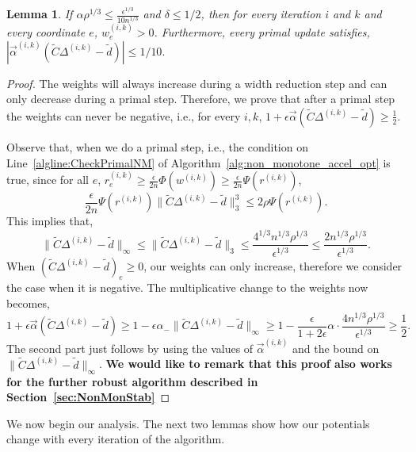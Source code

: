 \documentclass[11pt]{article}
\newtheorem{lemma}[theorem]{Lemma}
\newcommand\dd{\boldsymbol{\mathit{d}}}
\newcommand\rr{\boldsymbol{\mathit{r}}}
\newcommand\ww{\boldsymbol{\mathit{w}}}
\newcommand\CC{\boldsymbol{\mathit{C}}}
\newcommand{\wt}{\widetilde}
\begin{document}
\begin{lemma}\label{lem:positiveWopt}
 If $\alpha \rho^{1/3}\leq \frac{\epsilon^{1/3}}{10 n^{1/3}}$ and $\delta \leq 1/2$, then for every iteration $i$ and $k$ and every coordinate $e$, $\ww^{(i,k)}_e > 0$. Furthermore, every primal update satisfies, $|\overrightarrow{\alpha}^{(i,k)} (\wt{\CC}\Delta^{(i,k)}-\wt{\dd})|\leq 1/10.$
\end{lemma}
\begin{proof}
    The weights will always increase during a width reduction step and can only decrease during a primal step. Therefore, we prove that after a primal step the weights can never be negative, i.e., for every $i,k$, $1 + \epsilon \overrightarrow{\alpha}(\wt{\CC}\Delta^{(i,k)}-\wt{\dd}) \geq \frac{1}{2}$.

    Observe that, when we do a primal step, i.e., the condition on Line~\ref{algline:CheckPrimalNM} of Algorithm~\ref{alg:non_monotone_accel_opt} is true, since for all $e$, $\rr^{(i,k)}_e \geq \frac{\epsilon}{2n}\Phi(\ww^{(i,k)})\geq \frac{\epsilon}{2n}\Psi(\rr^{(i,k)})$, 
    \[
    \frac{\epsilon}{2n}\Psi(\rr^{(i,k)})\|\wt{\CC}\Delta^{(i,k)}-\wt{\dd}\|_3^3 \leq 2\rho \Psi(\rr^{(i,k)}).
    \]
    This implies that,
    \[
    \|\wt{\CC}\Delta^{(i,k)}-\wt{\dd}\|_{\infty}
\leq \|\wt{\CC}\Delta^{(i,k)}-\wt{\dd}\|_3 \leq \frac{4^{1/3} n^{1/3}\rho^{1/3}}{\epsilon^{1/3}} \leq \frac{2 n^{1/3}\rho^{1/3}}{\epsilon^{1/3}}.
    \]
    When $(\wt{\CC}\Delta^{(i,k)}-\wt{\dd})_e \geq 0$, our weights can only increase, therefore we consider the case when it is negative. The multiplicative change to the weights now becomes,
    \[
    1 + \epsilon \overrightarrow{\alpha}(\wt{\CC}\Delta^{(i,k)}-\wt{\dd}) \geq 1 - \epsilon \alpha_-\|\wt{\CC}\Delta^{(i,k)}-\wt{\dd}\|_{\infty} \geq 1 - \frac{\epsilon}{1+2\epsilon}\alpha \cdot \frac{4 n^{1/3}\rho^{1/3}}{\epsilon^{1/3}} \geq \frac{1}{2}.
    \]
    The second part just follows by using the values of $\overrightarrow{\alpha}^{(i,k)} $ and the bound on $\|\wt{\CC}\Delta^{(i,k)}-\wt{\dd}\|_{\infty}$.
    {\bf We would like to remark that this proof also works for the further robust algorithm described in Section~\ref{sec:NonMonStab}}
\end{proof}

We now begin our analysis. The next two lemmas show how our potentials change with every iteration of the algorithm.
\end{document}
